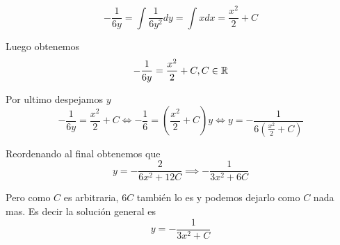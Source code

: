 \documentclass[a4paper,oneside,10.5pt]{article}
\begin{document}
\begin{enumerate}
\begin{ejemplo}
    \begin{equation*}
    -\frac{1}{6y} = \int \frac{1}{6y^{2}}  dy = \int x dx = \frac{x^{2}}{2} + C
    \end{equation*}

    Luego obtenemos
    \begin{equation*}
     -\frac{1}{6y} = \frac{x^{2}}{2} + C, C \in \mathbb{R}
    \end{equation*}

    Por ultimo despejamos $y$
    \begin{equation*}
      -\frac{1}{6y} = \frac{x^{2}}{2} + C \iff -\frac{1}{6} = (\frac{x^{2}}{2} + C)y \iff y = -\frac{1}{6(\frac{x^{2}}{2} + C)}
    \end{equation*}

    Reordenando al final obtenemos que
    \begin{equation*}
      y = -\frac{2}{6x^{2} + 12C} \implies -\frac{1}{3x^{2} + 6C}
    \end{equation*}

    Pero como $C$ es arbitraria, $6C$ también lo es y podemos dejarlo como $C$ nada mas.
    Es decir la solución general es
    \begin{equation*}
      y = -\frac{1}{3x^{2} + C}
    \end{equation*}
  \end{ejemplo}

\end{enumerate}
\end{document}
